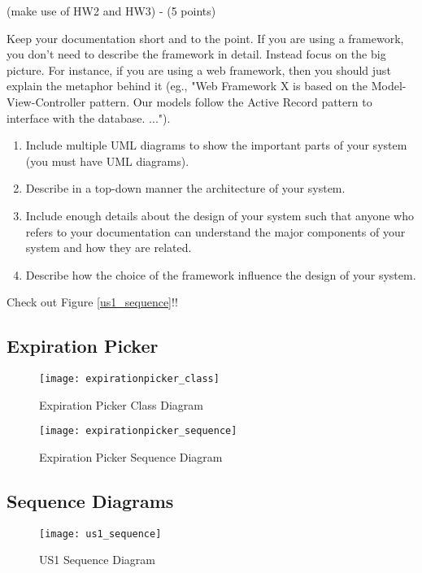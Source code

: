 (make use of HW2 and HW3) - (5 points)

Keep your documentation short and to the point. If you are using a framework, you don't need to describe the framework in detail. Instead focus on the big picture. For instance, if you are using a web framework, then you should just explain the metaphor behind it (eg., "Web Framework X is based on the Model-View-Controller pattern. Our models follow the Active Record pattern to interface with the database. ...").

\begin{enumerate}
	\item Include multiple UML diagrams to show the important parts of your system (you must have UML diagrams).
	\item Describe in a top-down manner the architecture of your system.
	\item Include enough details about the design of your system such that anyone who refers to your documentation can understand the major components of your system and how they are related.
	\item Describe how the choice of the framework influence the design of your system.
\end{enumerate}

Check out Figure \ref{us1_sequence}!!

\renewcommand\listfigurename{List of Diagrams}
\listoffigures

\subsection{Expiration Picker}
\begin{figure}[H]
    \centering
    \texttt{[image: expirationpicker\_class]}
    \caption{Expiration Picker Class Diagram}
    \label{fig:expirationpicker_classdiagram}
\end{figure}

\begin{figure}[H]
    \centering
    \texttt{[image: expirationpicker\_sequence]}
    \caption{Expiration Picker Sequence Diagram}
    \label{fig:expirationpicker_sequence}
\end{figure}

\subsection{Sequence Diagrams}
\begin{figure}[H]
    \centering
    \texttt{[image: us1\_sequence]}
    \caption{US1 Sequence Diagram}
    \label{fig:us1_sequence}
\end{figure}

